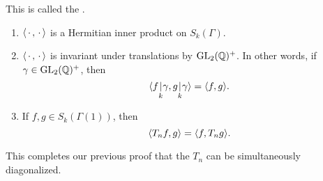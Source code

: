 \documentclass[a4paper]{article}
\begin{document}
This is called the .

\begin{prop}\leavevmode
  \begin{enumerate}
    \item $\langle\,\cdot\,, \,\cdot\,\rangle$ is a Hermitian inner product on $S_k(\Gamma)$.
    \item $\langle \,\cdot\,, \,\cdot\,\rangle$ is invariant under translations by $\mathrm{GL}_2(\mathbb{Q})^+$. In other words, if $\gamma \in \mathrm{GL}_2(\mathbb{Q})^+$, then
      \[
        \langle f\underset{k}{|}\gamma, g \underset{k}{|} \gamma\rangle = \langle f, g\rangle.
      \]
    \item If $f, g \in S_k(\Gamma(1))$, then
      \[
        \langle T_n f, g\rangle = \langle f, T_n g\rangle.
      \]
  \end{enumerate}
\end{prop}
This completes our previous proof that the $T_n$ can be simultaneously diagonalized.
\end{document}
